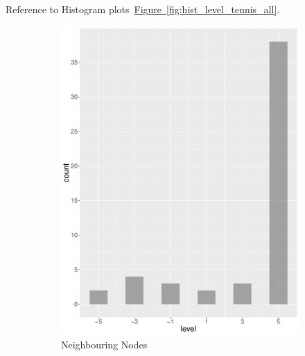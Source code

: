 Reference to Histogram plots~\hyperref[fig:hist_level_tennis_all]{Figure~\ref*{fig:hist_level_tennis_all}}.
\begin{figure}
    \centering
    \begin{subfigure}[b]{0.4\textwidth}
        \includegraphics[width=\textwidth]{plots/tennis/hist_level_nn}
        \caption{Neighbouring Nodes}
        \label{fig:hist_level_tennis_nn}
    \end{subfigure}
    ~
    \begin{subfigure}[b]{0.4\textwidth}

\end{subfigure}
\end{figure}
